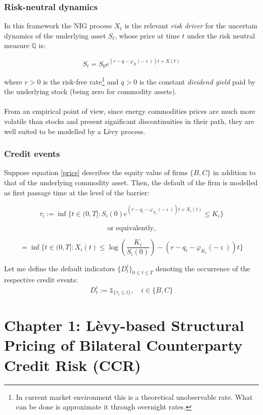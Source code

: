 \documentclass{beamer}
\begin{document}
\begin{frame}
\frametitle{Risk-neutral dynamics}
	In this framework the NIG process $X_{t}$ is the relevant \emph{risk driver} for the uncertain dynamics of the underlying asset $S_{t}$, whose price at time $t$ under the risk neutral measure $\mathbb{Q}$ is:

	\begin{equation}\label{price}
		S_{t}=S_0e^{(r-q-\varphi_{X}(-\imath))t+X(t)}
	\end{equation}

	where $r>0$ is the risk-free rate\footnote{In current market environment this is a theoretical unobservable rate. What can be done is approximate it through overnight rates.} and $q>0$ is the constant \emph{dividend yield} paid by the underlying stock (being zero for commodity assets). \\~\\

	From an empirical point of view, since energy commodities prices are much more volatile than stocks and present significant discontinuities in their path, they are  well suited to be modelled by a Lèvy process.
\end{frame}

\begin{frame}
\frametitle{Credit events}
	Suppose equation \ref{price} describes the equity value of firms $ \{B,C\}$ in addition to that of the underlying commodity asset. Then, the default of the firm is modelled as first passage time at the level of the barrier:


	$$\tau_{i}:= \inf \{ t \in (0,T] : S_{i}(0)e^{(r-q_{i}-\varphi_{X_{i}}(-\imath))t+X_{i}(t)} \leq K_{i}\}$$

	$$\text{or equivalently,}$$


	$$=\inf \{ t \in (0,T] : X_{i}(t) \leq \log{  \left(\frac{ K_{i} } {S_{i}(0)} \right)} - (r-q_{i}-\varphi_{K_{i}}(-\imath))t\}$$ 
	
	Let me define the default indicators $\{ D^{i}_t \}_{0 \leq t \leq T}$ denoting the occurrence of the respective credit events:
	$$D_{t}^i := \mathds{1}_{ \{ \tau_{i} \leq t \} }, \quad i \in \{B,C  \} $$

\end{frame}


\section{Chapter 1: Lèvy-based Structural Pricing of Bilateral Counterparty Credit Risk (CCR) }
\end{document}
